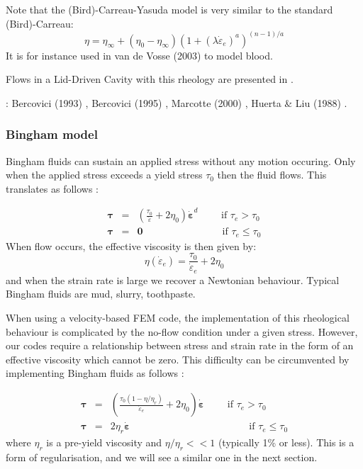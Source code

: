 Note that the (Bird)-Carreau-Yasuda model \cite{yaac81,osru14} is very similar to the standard (Bird)-Carreau:
\begin{equation}
\eta = \eta_\infty + (\eta_0-\eta_\infty) \left(1 + (\lambda \dot{\varepsilon}_{e})^a \right)^{(n-1)/a}
\end{equation}
It is for instance used in van de Vosse \etal (2003) \cite{vadv03} to model blood.

Flows in a Lid-Driven Cavity with this rheology are presented in \cite{zifr07,shal09}.

\Literature: Bercovici (1993) \cite{berc93}, Bercovici (1995) \cite{berc95},
Marcotte (2000) \cite{marc00}, Huerta \& Liu (1988) \cite{huli88}.

\subsubsection{Bingham model} \label{sec:bingham}

Bingham \cite{bingham} fluids can sustain an applied stress without any motion occuring. Only when the applied stress exceeds
a yield stress $\tau_0$ then the fluid flows. This translates as follows \cite{reddybook2}:

\begin{eqnarray}
{\bm \tau} &=& \left(  \frac{\tau_0}{\dot{\varepsilon}} + 2 \eta_0  \right)\dot{\bm \varepsilon}^d \qquad 
\text{ if } {\tau}_{e}>\tau_0 \\
{\bm \tau} &=& {\bm 0} \qquad\qquad\qquad\qquad  \text{if } \tau_{e} \leq \tau_0 
\end{eqnarray}
When flow occurs, the effective viscosity is then given by:
\begin{equation}
\eta(\dot{\varepsilon}_e) = \frac{\tau_0}{\dot{\varepsilon}_e} + 2 \eta_0 
\end{equation}
and when the strain rate is large we recover a Newtonian behaviour.
Typical Bingham fluids are mud, slurry, toothpaste.  

When using a velocity-based FEM code, the implementation of this rheological behaviour 
is complicated by the no-flow condition under a given stress. However, our codes
require a relationship between stress and strain rate in the form of an effective viscosity
which cannot be zero. 
This difficulty can be circumvented by implementing Bingham fluids as follows \cite{reddybook2}:

\begin{eqnarray}
{\bm \tau} &=& \left(  \frac{\tau_0(1-\eta/\eta_r)}{\dot{\varepsilon}_e} 
+ 2 \eta_0  \right)\dot{\bm \varepsilon} \qquad \text{ if } \tau_{e}>\tau_0 \\
{\bm \tau} &=& 2 \eta_r \dot{\bm \varepsilon}  \qquad\qquad\qquad\qquad\qquad\qquad  
\text{if } \tau_{e} \leq \tau_0 
\end{eqnarray}
where $\eta_r$ is a pre-yield viscosity and $\eta/\eta_r<<1$ (typically 1\% or less). This is a form of 
regularisation, and we will see a similar one in the next section.

